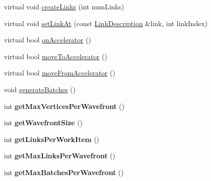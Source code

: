 \begin{DoxyCompactItemize}
\item 
virtual void \hyperlink{classbtSoftBodyLinkDataOpenCLSIMDAware_afa62243874cf252299a3dd17eb6502c1}{create\+Links} (int num\+Links)
\item 
virtual void \hyperlink{classbtSoftBodyLinkDataOpenCLSIMDAware_a02bc02902c70fab9bc96d6d8adcc69b5}{set\+Link\+At} (const \hyperlink{classbtSoftBodyLinkData_1_1LinkDescription}{Link\+Description} \&link, int link\+Index)
\item 
virtual bool \hyperlink{classbtSoftBodyLinkDataOpenCLSIMDAware_a0b6e6e7c88ca01fcb83160bfec42ecbe}{on\+Accelerator} ()
\item 
virtual bool \hyperlink{classbtSoftBodyLinkDataOpenCLSIMDAware_ac76fd4a1a8b28a48e283050efc14a096}{move\+To\+Accelerator} ()
\item 
virtual bool \hyperlink{classbtSoftBodyLinkDataOpenCLSIMDAware_a5ae3174b36d5ee2c13c96ddf775785b8}{move\+From\+Accelerator} ()
\item 
void \hyperlink{classbtSoftBodyLinkDataOpenCLSIMDAware_afe1f0f82b680db86b53f86711444e5e0}{generate\+Batches} ()
\item 
\mbox{\label{classbtSoftBodyLinkDataOpenCLSIMDAware_aaa92ad2be3e876c9f166c25359428782}} 
int {\bfseries get\+Max\+Vertices\+Per\+Wavefront} ()
\item 
\mbox{\label{classbtSoftBodyLinkDataOpenCLSIMDAware_aebd97637efa9006aa0a8dc7e0d3399b4}} 
int {\bfseries get\+Wavefront\+Size} ()
\item 
\mbox{\label{classbtSoftBodyLinkDataOpenCLSIMDAware_aba4551d9c0fd8035ff1db4b5584ce2c9}} 
int {\bfseries get\+Links\+Per\+Work\+Item} ()
\item 
\mbox{\label{classbtSoftBodyLinkDataOpenCLSIMDAware_aa06ef3fc9271423186db2993834acf13}} 
int {\bfseries get\+Max\+Links\+Per\+Wavefront} ()
\item 
\mbox{\label{classbtSoftBodyLinkDataOpenCLSIMDAware_aa70ec1e6f3a5c2e00e2bb7e9ca77487f}} 
int {\bfseries get\+Max\+Batches\+Per\+Wavefront} ()
\item 
\mbox{\label{classbtSoftBodyLinkDataOpenCLSIMDAware_a9c043815f72b537dfa3dce9b23efbc94}} 

\end{DoxyCompactItemize}
